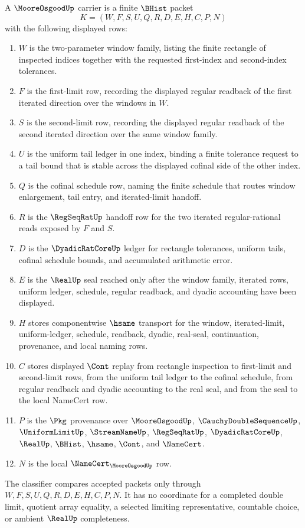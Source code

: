 \begin{definition}\label{def:moore-osgood-carrier}
A $\MooreOsgoodUp$ carrier is a finite $\BHist$ packet
$$
K=(W,F,S,U,Q,R,D,E,H,C,P,N)
$$
with the following displayed rows:
\begin{enumerate}
\item $W$ is the two-parameter window family, listing the finite rectangle of inspected indices together with the requested first-index and second-index tolerances.
\item $F$ is the first-limit row, recording the displayed regular readback of the first iterated direction over the windows in $W$.
\item $S$ is the second-limit row, recording the displayed regular readback of the second iterated direction over the same window family.
\item $U$ is the uniform tail ledger in one index, binding a finite tolerance request to a tail bound that is stable across the displayed cofinal side of the other index.
\item $Q$ is the cofinal schedule row, naming the finite schedule that routes window enlargement, tail entry, and iterated-limit handoff.
\item $R$ is the $\RegSeqRatUp$ handoff row for the two iterated regular-rational reads exposed by $F$ and $S$.
\item $D$ is the $\DyadicRatCoreUp$ ledger for rectangle tolerances, uniform tails, cofinal schedule bounds, and accumulated arithmetic error.
\item $E$ is the $\RealUp$ seal reached only after the window family, iterated rows, uniform ledger, schedule, regular readback, and dyadic accounting have been displayed.
\item $H$ stores componentwise $\hsame$ transport for the window, iterated-limit, uniform-ledger, schedule, readback, dyadic, real-seal, continuation, provenance, and local naming rows.
\item $C$ stores displayed $\Cont$ replay from rectangle inspection to first-limit and second-limit rows, from the uniform tail ledger to the cofinal schedule, from regular readback and dyadic accounting to the real seal, and from the seal to the local NameCert row.
\item $P$ is the $\Pkg$ provenance over $\MooreOsgoodUp$, $\CauchyDoubleSequenceUp$, $\UniformLimitUp$, $\StreamNameUp$, $\RegSeqRatUp$, $\DyadicRatCoreUp$, $\RealUp$, $\BHist$, $\hsame$, $\Cont$, and $\NameCert$.
\item $N$ is the local $\NameCert_{\MooreOsgoodUp}$ row.
\end{enumerate}
The classifier compares accepted packets only through $W,F,S,U,Q,R,D,E,H,C,P,N$. It has no coordinate for a completed double limit, quotient array equality, a selected limiting representative, countable choice, or ambient $\RealUp$ completeness.
\end{definition}

